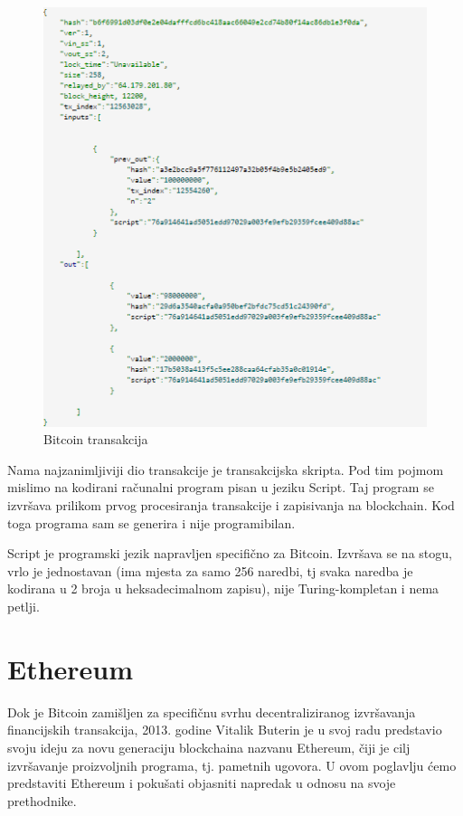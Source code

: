\documentclass[a4paper,oneside,12pt]{memoir} %
\begin{document}
\begin{figure}[H]
\centering
\includegraphics[scale=0.73]{transakcija}
\caption{Bitcoin transakcija}
\label{fig:transakcija}
\end{figure}

Nama najzanimljiviji dio transakcije je transakcijska skripta. Pod tim pojmom mislimo na kodirani računalni program pisan u jeziku Script. Taj program se izvršava prilikom prvog procesiranja transakcije i zapisivanja na blockchain. Kod toga programa sam se generira i nije programibilan. 

Script\cite{script} je programski jezik napravljen specifično za Bitcoin. Izvršava se na stogu, vrlo je jednostavan (ima mjesta za samo 256 naredbi, tj svaka naredba je kodirana u 2 broja u heksadecimalnom zapisu), nije Turing-kompletan i nema petlji.

\chapter{Ethereum}

Dok je Bitcoin zamišljen za specifičnu svrhu decentraliziranog izvršavanja financijskih transakcija, 2013. godine Vitalik Buterin je u svoj radu\cite{eth_paper} predstavio svoju ideju za novu generaciju blockchaina nazvanu Ethereum, čiji je cilj izvršavanje proizvoljnih programa, tj. pametnih ugovora. U ovom poglavlju ćemo predstaviti Ethereum i pokušati objasniti napredak u odnosu na svoje prethodnike.
\end{document}

